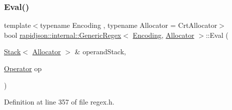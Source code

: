 \mbox{\label{classrapidjson_1_1internal_1_1_generic_regex_a482f2304ba52d6dcd8d3adac4850251d}} 
\subsubsection{\texorpdfstring{Eval()}{Eval()}}
{\footnotesize\ttfamily template$<$typename Encoding , typename Allocator  = Crt\+Allocator$>$ \\
bool \mbox{\hyperlink{classrapidjson_1_1internal_1_1_generic_regex}{rapidjson\+::internal\+::\+Generic\+Regex}}$<$ \mbox{\hyperlink{classrapidjson_1_1_encoding}{Encoding}}, \mbox{\hyperlink{classrapidjson_1_1_allocator}{Allocator}} $>$\+::Eval (\begin{DoxyParamCaption}\item[{\mbox{\hyperlink{classrapidjson_1_1internal_1_1_stack}{Stack}}$<$ \mbox{\hyperlink{classrapidjson_1_1_allocator}{Allocator}} $>$ \&}]{operand\+Stack,  }\item[{\mbox{\hyperlink{classrapidjson_1_1internal_1_1_generic_regex_a512e6844d1d454b502727df432f8e7b9}{Operator}}}]{op }\end{DoxyParamCaption})\hspace{0.3cm}{\ttfamily [private]}}



Definition at line 357 of file regex.\+h.


